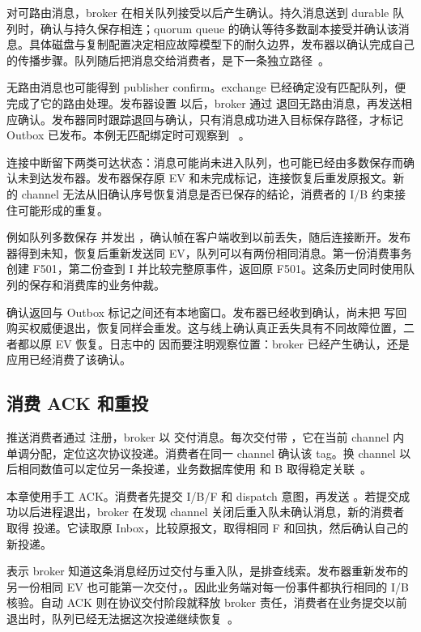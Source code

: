 对可路由消息，broker 在相关队列接受以后产生确认。持久消息送到 durable 队列时，确认与持久保存相连；quorum queue 的确认等待多数副本接受并确认该消息。具体磁盘与复制配置决定相应故障模型下的耐久边界，发布器以确认完成自己的传播步骤。队列随后把消息交给消费者，是下一条独立路径~\cite{rabbitmq-confirms,rabbitmq-quorum-queues}。

无路由消息也可能得到 publisher confirm。exchange 已经确定没有匹配队列，便完成了它的路由处理。发布器设置  以后，broker 通过  退回无路由消息，再发送相应确认。发布器同时跟踪退回与确认，只有消息成功进入目标保存路径，才标记 Outbox 已发布。本例无匹配绑定时可观察到 ~\cite{rabbitmq-confirms,amqp091}。

连接中断留下两类可达状态：消息可能尚未进入队列，也可能已经由多数保存而确认未到达发布器。发布器保存原 EV 和未完成标记，连接恢复后重发原报文。新的 channel 无法从旧确认序号恢复消息是否已保存的结论，消费者的 I/B 约束接住可能形成的重复。

例如队列多数保存  并发出 ，确认帧在客户端收到以前丢失，随后连接断开。发布器得到未知，恢复后重新发送同 EV，队列可以有两份相同消息。第一份消费事务创建 F501，第二份查到 I 并比较完整原事件，返回原 F501。这条历史同时使用队列的保存和消费库的业务仲裁。

确认返回与 Outbox 标记之间还有本地窗口。发布器已经收到确认，尚未把  写回购买权威便退出，恢复同样会重发。这与线上确认真正丢失具有不同故障位置，二者都以原 EV 恢复。日志中的  因而要注明观察位置：broker 已经产生确认，还是应用已经消费了该确认。

\subsection{消费 ACK 和重投}

推送消费者通过  注册，broker 以  交付消息。每次交付带 ，它在当前 channel 内单调分配，定位这次协议投递。消费者在同一 channel 确认该 tag。换 channel 以后相同数值可以定位另一条投递，业务数据库使用  和 B 取得稳定关联~\cite{rabbitmq-confirms}。

本章使用手工 ACK。消费者先提交 I/B/F 和 dispatch 意图，再发送 。若提交成功以后进程退出，broker 在发现 channel 关闭后重入队未确认消息，新的消费者取得  投递。它读取原 Inbox，比较原报文，取得相同 F 和回执，然后确认自己的新投递。

 表示 broker 知道这条消息经历过交付与重入队，是排查线索。发布器重新发布的另一份相同 EV 也可能第一次交付，。因此业务端对每一份事件都执行相同的 I/B 核验。自动 ACK 则在协议交付阶段就释放 broker 责任，消费者在业务提交以前退出时，队列已经无法据这次投递继续恢复~\cite{rabbitmq-confirms}。

